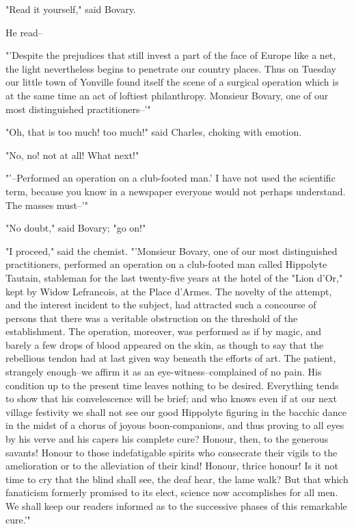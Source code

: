 \documentclass[11pt,twocolumn]{ltugboat}
\begin{document}
"Read it yourself," said Bovary.

He read--

"'Despite the prejudices that still invest a part of the face of Europe
like a net, the light nevertheless begins to penetrate our country
places. Thus on Tuesday our little town of Yonville found itself the
scene of a surgical operation which is at the same time an act of
loftiest philanthropy. Monsieur Bovary, one of our most distinguished
practitioners--'"

"Oh, that is too much! too much!" said Charles, choking with emotion.

"No, no! not at all! What next!"

"'--Performed an operation on a club-footed man.' I have not used the
scientific term, because you know in a newspaper everyone would not
perhaps understand. The masses must--'"

"No doubt," said Bovary; "go on!"

"I proceed," said the chemist. "'Monsieur Bovary, one of our most
distinguished practitioners, performed an operation on a club-footed man
called Hippolyte Tautain, stableman for the last twenty-five years at
the hotel of the "Lion d'Or," kept by Widow Lefrancois, at the Place
d'Armes. The novelty of the attempt, and the interest incident to the
subject, had attracted such a concourse of persons that there was
a veritable obstruction on the threshold of the establishment. The
operation, moreover, was performed as if by magic, and barely a
few drops of blood appeared on the skin, as though to say that the
rebellious tendon had at last given way beneath the efforts of art. The
patient, strangely enough--we affirm it as an eye-witness--complained
of no pain. His condition up to the present time leaves nothing to be
desired. Everything tends to show that his convelescence will be brief;
and who knows even if at our next village festivity we shall not see our
good Hippolyte figuring in the bacchic dance in the midst of a chorus
of joyous boon-companions, and thus proving to all eyes by his verve
and his capers his complete cure? Honour, then, to the generous savants!
Honour to those indefatigable spirits who consecrate their vigils to the
amelioration or to the alleviation of their kind! Honour, thrice honour!
Is it not time to cry that the blind shall see, the deaf hear, the lame
walk? But that which fanaticism formerly promised to its elect, science
now accomplishes for all men. We shall keep our readers informed as to
the successive phases of this remarkable cure.'"
\end{document}
